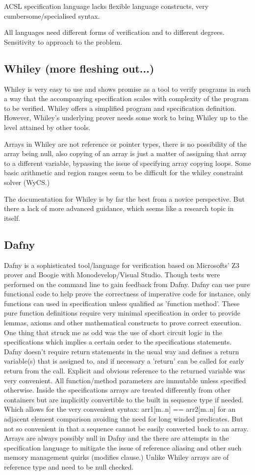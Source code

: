 \documentclass[10pt]{article} %
\begin{document}
ACSL specification language lacks flexible language constructs, very cumbersome\slash specialised syntax.

All languages need different forms of verification and to different degrees. Sensitivity to approach to the problem.
\subsection{Whiley (more fleshing out...)}
	Whiley is very easy to use and shows promise as a tool to verify programs in such a way that the accompanying specification scales with complexity of the program to be verified. Whiley offers a simplified program and specification definition. However, Whiley's underlying prover needs some work to bring Whiley up to the level attained by other tools.

Arrays in Whiley are not reference or pointer types, there is no possibility of the array being null, also copying of an array is just a matter of assigning that array to a different variable, bypassing the issue of specifying array copying loops. Some basic arithmetic and region ranges seem to be difficult for the whiley constraint solver (WyCS.)

The documentation for Whiley is by far the best from a novice perspective. But there a lack of more advanced guidance, which seems like a research topic in itself.
\subsection{Dafny}
	Dafny is a sophisticated tool\slash language for verification based on Microsofts' Z3 prover and Boogie with Monodevelop\slash Visual Studio. Though tests were performed on the command line to gain feedback from Dafny. Dafny can use pure functional code to help prove the correctness of imperative code for instance, only functions can used in specification unless qualified as 'function method'. These pure function definitions require very minimal specification in order to provide lemmas, axioms and other mathematical constructs to prove correct execution. One thing that struck me as odd was the use of short circuit logic in the specifications which implies a certain order to the specifications statements. Dafny doesn't require return statements in the usual way and defines a return variable(s) that is assigned to, and if necessary a 'return' can be called for early return from the call. Explicit and obvious reference to the returned variable was very convenient. All function\slash method parameters are immutable unless specified otherwise.
	Inside the specifications arrays are treated differently from other containers but are implicitly convertible to the built in sequence type if needed. Which allows for the very convenient syntax: arr1[m..n] == arr2[m..n] for an adjacent element comparison avoiding the need for long winded predicates. But not so convenient in that a sequence cannot be easily converted back to an array. Arrays are always possibly null in Dafny and the there are attempts in the specification language to mitigate the issue of reference aliasing and other such memory management quirks (modifies clause.) Unlike Whiley arrays are of reference type and need to be null checked.
\end{document}
